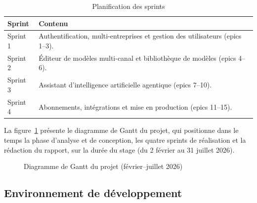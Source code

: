 \documentclass[12pt,a4paper,oneside]{report}
\begin{document}
\begin{table}[H]
\centering
\caption{Planification des sprints}
\label{tab:sprints}
\small
\begin{tabularx}{\linewidth}{lX}
\toprule
\textbf{Sprint} & \textbf{Contenu} \\
\midrule
Sprint 1 & Authentification, multi-entreprises et gestion des utilisateurs (epics 1--3). \\
Sprint 2 & Éditeur de modèles multi-canal et bibliothèque de modèles (epics 4--6). \\
Sprint 3 & Assistant d'intelligence artificielle agentique (epics 7--10). \\
Sprint 4 & Abonnements, intégrations et mise en production (epics 11--15). \\
\bottomrule
\end{tabularx}
\end{table}

La figure~\ref{fig:gantt} présente le diagramme de Gantt du projet, qui
positionne dans le temps la phase d'analyse et de conception, les quatre
sprints de réalisation et la rédaction du rapport, sur la durée du stage
(du 2 février au 31 juillet 2026).

\begin{figure}[H]
\centering
{}
\caption{Diagramme de Gantt du projet (février--juillet 2026)}
\label{fig:gantt}
\end{figure}

\subsection{Environnement de développement}
\end{document}
